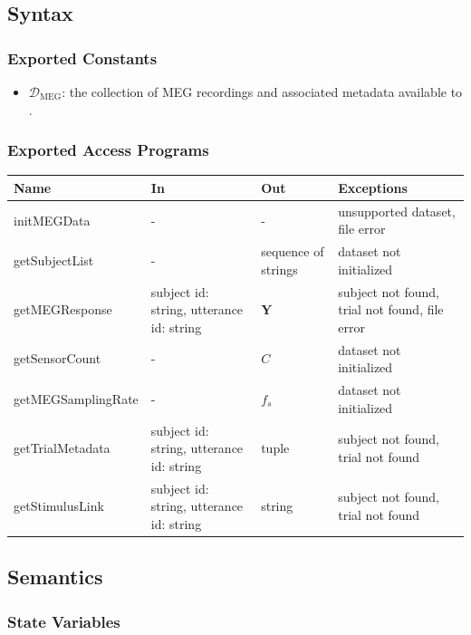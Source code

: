 \documentclass[12pt, titlepage]{article}
\begin{document}
\subsection{Syntax}

\subsubsection{Exported Constants}

\begin{itemize}
    \item $\mathcal{D}_{\mathrm{MEG}}$: the collection of MEG recordings and associated metadata available to \progname.
\end{itemize}

\subsubsection{Exported Access Programs}

\begin{center}
\begin{tabular}{p{3.2cm} p{4.2cm} p{4.2cm} p{2.4cm}}
\hline
\textbf{Name} & \textbf{In} & \textbf{Out} & \textbf{Exceptions} \\
\hline
initMEGData & - & - & unsupported dataset, file error \\
getSubjectList & - & sequence of strings & dataset not initialized \\
getMEGResponse & subject id: string, utterance id: string & $\mathbf{Y}$ & subject not found, trial not found, file error \\
getSensorCount & - & $C$ & dataset not initialized \\
getMEGSamplingRate & - & $f_s$ & dataset not initialized \\
getTrialMetadata & subject id: string, utterance id: string & tuple & subject not found, trial not found \\
getStimulusLink & subject id: string, utterance id: string & string & subject not found, trial not found \\
\hline
\end{tabular}
\end{center}

\subsection{Semantics}

\subsubsection{State Variables}
\end{document}

